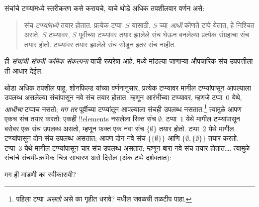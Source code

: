 \documentclass[../../../include/open-logic-section]{subfiles}
\begin{document}

संचांचे टप्प्यांमध्ये
स्तरीकरण कसे
करायचे, याचे
थोडे अधिक
तपशीलवार
वर्णन असे:
\begin{quote}
  संच \emph{टप्प्यांमध्ये}
  तयार होतात.
  प्रत्येक टप्पा~$S$
  यासाठी, $S$ च्या \emph{आधी}
  कोणते टप्पे येतात, हे निश्चित असते.
  $S$ टप्प्यावर,
  $S$ पूर्वीच्या
  टप्प्यांवर
  तयार झालेले
  संच घेऊन
  बनलेल्या
  प्रत्येक
  संग्रहाचा
  संच तयार
  होतो.
  टप्प्यांवर
  तयार झालेले
  संच सोडून
  इतर संच
  नाहीत.
  \citep[p.~323]{Shoenfield:AST}
\end{quote}
ही \emph{संचांची
संचयी-क्रमिक
संकल्पना}
याची रूपरेषा
आहे. 
मध्ये मांडल्या
जाणाऱ्या
औपचारिक
संच उपपत्तीला
ती आधार
देईल.

थोडा अधिक
तपशील पाहू.
शोनफिल्ड
यांच्या
वर्णनानुसार,
प्रत्येक
टप्प्यावर
मागील
टप्प्यांपासून
आपल्याला
उपलब्ध
असलेल्या
संचांपासून
नवे संच
तयार होतात.
म्हणून
आरंभीच्या
टप्प्यावर,
म्हणजे
टप्पा~$0$
येथे,
\emph{आधीचा}
टप्पाच
नसतो;
\emph{मग तर}
पूर्वीच्या
टप्प्यांतून
आपल्याला
संचही
उपलब्ध
नसतात.\footnote{
  पहिला
  टप्पा
  \emph{असतो}
  असे का
  गृहीत
  धरावे?
  मधील
  \stagesord{}
  जवळची
  तळटीप
  पाहा.}
त्यामुळे
आपण
एकच संच
तयार करतो:
एकही
!!{element}s
नसलेला
रिक्त संच
$\emptyset$.
टप्पा~$1$
येथे
मागील
टप्प्यांपासून
बरोबर
एक संच
उपलब्ध
असतो,
म्हणून
फक्त एक
नवा संच
$\{\emptyset\}$
तयार होतो.
टप्पा~$2$
येथे मागील
टप्प्यांपासून
दोन संच
उपलब्ध
असतात;
आपण दोन
नवे संच
$\{\{\emptyset\}\}$
आणि
$\{\emptyset,
\{\emptyset\}\}$
तयार करतो.
टप्पा~$3$
येथे मागील
टप्प्यांपासून
चार संच
उपलब्ध
असतात;
म्हणून
बारा
नवे संच
तयार
होतात\ldots.
त्यामुळे
संचांचे
संचयी-क्रमिक
चित्र
साधारण
असे
दिसेल
(अंक टप्पे
दर्शवतात):
\begin{center}
\end{center}
मग ही मांडणी
का स्वीकारावी?
\end{document}
